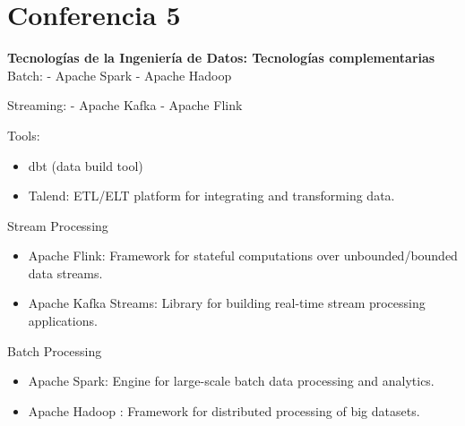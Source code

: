 \documentclass[12pt]{book}
\begin{document}
\chapter{Conferencia 5}
\normalfont\LARGE \textbf{Tecnologías de la Ingeniería de Datos: Tecnologías complementarias}
\normalfont\small\\

Batch:
- Apache Spark
- Apache Hadoop

Streaming:
- Apache Kafka
- Apache Flink

Tools:
\begin{itemize}
    \item dbt (data build tool)
    \item Talend: ETL/ELT platform for integrating and transforming data.
\end{itemize}

Stream Processing
\begin{itemize}
    \item Apache Flink: Framework for stateful computations over unbounded/bounded data streams.
    \item Apache Kafka Streams: Library for building real-time stream processing applications.
\end{itemize}

Batch Processing
\begin{itemize}
    \item Apache Spark: Engine for large-scale batch data processing and analytics.
    \item Apache Hadoop : Framework for distributed processing of big datasets.
\end{itemize}
\end{document}
